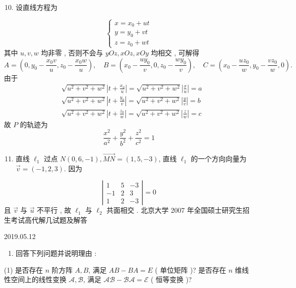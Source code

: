 \documentclass[10pt]{article}
\begin{document}
\begin{enumerate}
  \setcounter{enumi}{9}
  \item  设直线方程为 
\end{enumerate}
$$
\left\{\begin{array}{l}
x=x_{0}+u t \\
y=y_{0}+v t \\
z=z_{0}+w t
\end{array}\right.
$$
 其中  $u, v, w$  均非零 ,  否则不会与  $y O z, x O z, x O y$  均相交 ,  可解得 
$$
A=\left(0, y_{0}-\frac{x_{0} v}{u}, z_{0}-\frac{x_{0} w}{u}\right), \quad B=\left(x_{0}-\frac{u y_{0}}{v}, 0, z_{0}-\frac{w y_{0}}{v}\right), \quad C=\left(x_{0}-\frac{u z_{0}}{w}, y_{0}-\frac{v z_{0}}{w}, 0\right) .
$$
 由于 
$$
\begin{aligned}
&\sqrt{u^{2}+v^{2}+w^{2}}\left|t+\frac{x_{0}}{u}\right|=\sqrt{u^{2}+v^{2}+w^{2}}\left|\frac{x}{u}\right|=a \\
&\sqrt{u^{2}+v^{2}+w^{2}}\left|t+\frac{y_{0}}{v}\right|=\sqrt{u^{2}+v^{2}+w^{2}}\left|\frac{y}{v}\right|=b \\
&\sqrt{u^{2}+v^{2}+w^{2}}\left|t+\frac{z_{0}}{w}\right|=\sqrt{u^{2}+v^{2}+w^{2}}\left|\frac{z}{w}\right|=c
\end{aligned}
$$
 故  $P$  的轨迹为 
$$
\frac{x^{2}}{a^{2}}+\frac{y^{2}}{b^{2}}+\frac{z^{2}}{c^{2}}=1
$$

\begin{enumerate}
  \setcounter{enumi}{10}
  \item  直线  $\ell_{1}$  过点  $N(0,6,-1), \overrightarrow{M N}=(1,5,-3)$,  直线  $\ell_{1}$  的一个方向向量为  $\vec{v}=(-1,2,3)$.  因为 
\end{enumerate}
$$
\left|\begin{array}{ccc}
1 & 5 & -3 \\
-1 & 2 & 3 \\
1 & 2 & -3
\end{array}\right|=0
$$
 且  $\vec{v}$  与  $\vec{u}$  不平行 ,  故  $\ell_{1}$  与  $\ell_{2}$  共面相交 .  北京大学  2007  年全国硕士研究生招生考试高代解几试题及解答 

   

2019.05.12

\begin{enumerate}
  \item  回答下列问题并说明理由 :
\end{enumerate}
(1)  是否存在  $n$  阶方阵  $A, B$,  满足  $A B-B A=E$ ( 单位矩阵 )?  是否存在  $n$  维线性空间上的线性变换  $\mathscr{A}, \mathscr{B}$,  满足  $\mathscr{A} \mathscr{B}-\mathscr{B} \mathscr{A}=\mathscr{E}$ ( 恒等变换 )?
\end{document}
